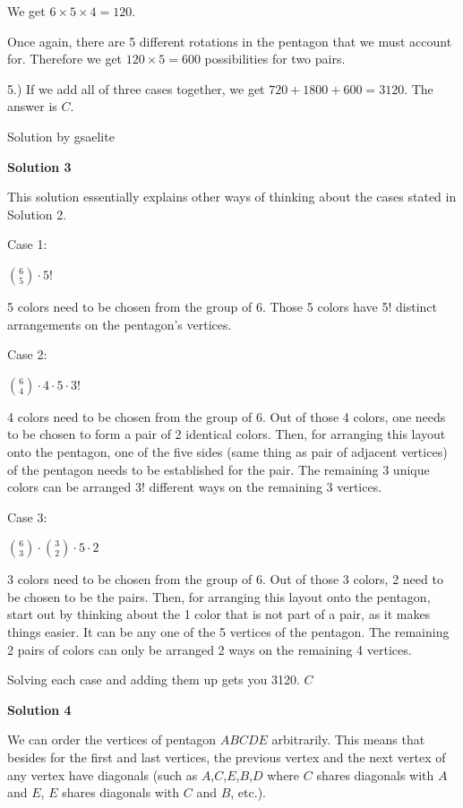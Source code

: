 \begin{enumerate}
 We get $6\times5\times4=120$.

 Once again, there are 5 different rotations in the pentagon that we must account for. Therefore we get $120\times5=600$  possibilities for two pairs. 

 
5.) If we add all of three cases together, we get $720+1800+600=3120$. The answer is $C$.

 Solution by gsaelite

 



\textbf{Solution 3}

This solution essentially explains other ways of thinking about the cases stated in Solution 2.

 Case 1:

 ${6\choose5} \cdot 5!$

 5 colors need to be chosen from the group of 6. Those 5 colors have 5! distinct arrangements on the pentagon's vertices.

 Case 2:

 ${6\choose4} \cdot4\cdot5\cdot3!$

 4 colors need to be chosen from the group of 6. Out of those 4 colors, one needs to be chosen to form a pair of 2 identical colors. Then, for arranging this layout onto the pentagon, one of the five sides (same thing as pair of adjacent vertices) of the pentagon needs to be established for the pair. The remaining 3 unique colors can be arranged 3! different ways on the remaining 3 vertices.

 Case 3:

 ${6\choose3} \cdot {3\choose2} \cdot5\cdot2$

 3 colors need to be chosen from the group of 6. Out of those 3 colors, 2 need to be chosen to be the pairs. Then, for arranging this layout onto the pentagon, start out by thinking about the 1 color that is not part of a pair, as it makes things easier. It can be any one of the 5 vertices of the pentagon. The remaining 2 pairs of colors can only be arranged 2 ways on the remaining 4 vertices.

 Solving each case and adding them up gets you 3120. $\boxed{C}$




\textbf{Solution 4}

We can order the vertices of pentagon $ABCDE$ arbitrarily. This means that besides for the first and last vertices, the previous vertex and the next vertex of any vertex have diagonals (such as $A$,$C$,$E$,$B$,$D$ where $C$ shares diagonals with $A$ and $E$, $E$ shares diagonals with $C$ and $B$, etc.). 


\end{enumerate}
